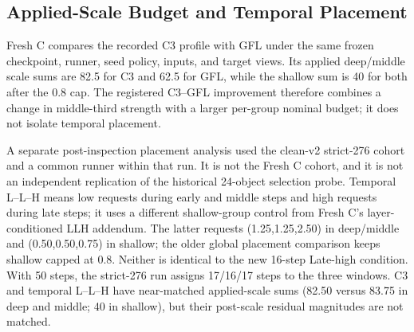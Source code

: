 \documentclass[times,twocolumn,final]{elsarticle}
\providecommand{\DIFadd}[1]{{\protect\color{blue} \sf #1}} %
\providecommand{\DIFaddbegin}{} %
\providecommand{\DIFaddend}{} %
\begin{document}
  \DIFaddbegin \subsection{Applied-Scale Budget and Temporal Placement}
\label{subsec:temporal-placement}

\DIFadd{Fresh C compares the recorded }\DIFaddend C3   \DIFaddbegin \DIFadd{profile with GFL under the same frozen checkpoint, runner, seed policy, inputs, and target views. Its applied deep/middle scale sums are 82.5 for }\DIFaddend C3   \DIFaddbegin \DIFadd{and 62.5 for GFL, while the shallow sum is 40 for both after the 0.8 cap. The registered C3--GFL improvement therefore combines a change in middle-third strength with a larger per-group nominal budget; it does not isolate temporal placement.
}

\DIFadd{A separate post-inspection placement analysis used the clean-v2 strict-276 cohort and a common runner within that run. It is not the Fresh C cohort, and it is not an independent replication of the historical }\DIFaddend 24-object   \DIFaddbegin \DIFadd{selection probe. Temporal L--L--H means low requests during early and middle steps and high requests during late steps; it uses a different shallow-group control from Fresh C's layer-conditioned LLH addendum. The latter requests (1.25,1.25,2.50) in deep/middle and (0.50,0.50,0.75) in shallow; the older global placement comparison keeps shallow capped at 0.8. Neither is identical to the new 16-step Late-high condition. With 50 steps, the strict-276 run assigns 17/16/17 steps to the three windows. C3 and temporal L--L--H have near-matched applied-scale sums (82.50 versus 83.75 in deep and middle; 40 in shallow), but their post-scale residual magnitudes are not matched}\DIFaddend .
\end{document}
